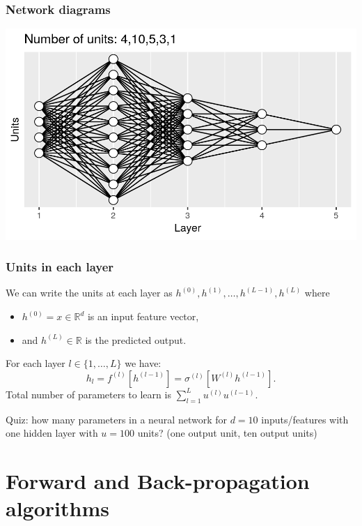 \documentclass{beamer}
\begin{document}
\begin{frame}
  \frametitle{Network diagrams}

\includegraphics[width=\textwidth]{figure-architecture-fiveLayers}
\end{frame}

\begin{frame}
  \frametitle{Units in each layer}
We can write the units at each layer as
$h^{(0)},h^{(1)},\dots, h^{(L-1)}, h^{(L)}$ where
\begin{itemize}
\item $h^{(0)}=x\in\mathbb R^d$ is an input feature vector,
\item and
$h^{(L)}\in\mathbb R$ is the predicted output.
\end{itemize}
For
each layer $l\in \{1, \dots, L\}$ we have:
\begin{equation*}
  \label{eq:h_l}
  h_l = f^{(l)}\left[h^{(l-1)}\right] =
  \sigma^{(l)}\left[ W^{(l)} h^{(l-1)} \right].
\end{equation*}
Total number of parameters to learn is
$\sum_{l=1}^L u^{(l)} u^{(l-1)}.$

Quiz: how many parameters in a
neural network for $d=10$ inputs/features with one hidden layer with
$u=100$ units? (one output unit, ten output units)
\end{frame}



\section{Forward and Back-propagation algorithms}
\end{document}
